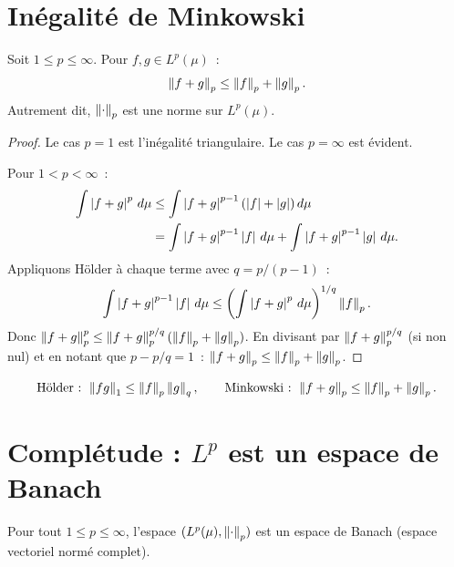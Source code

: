 \section{In\'egalit\'e de Minkowski}

\begin{theoreme}
\label{thm:minkowski}
Soit $1 \leq p \leq \infty$. Pour $f, g \in L^p(\mu)$~:
\[
\left\| f + g \right\|_p \leq \left\| f \right\|_p + \left\| g \right\|_p.
\]
Autrement dit, $\left\| \cdot \right\|_p$ est une norme sur $L^p(\mu)$.
\end{theoreme}

\begin{proof}
Le cas $p = 1$ est l'in\'egalit\'e triangulaire. Le cas $p = \infty$ est \'evident.

Pour $1 < p < \infty$~:
\begin{align*}
\int \left| f + g \right|^p\, d\mu &\leq \int \left| f + g \right|^{p-1} (\left| f \right| + \left| g \right|)\, d\mu
\\
&= \int \left| f + g \right|^{p-1} \left| f \right|\, d\mu + \int \left| f + g \right|^{p-1} \left| g \right|\, d\mu.
\end{align*}
Appliquons H\"older \`a chaque terme avec $q = p/(p-1)$~:
\[
\int \left| f + g \right|^{p-1} \left| f \right|\, d\mu \leq
\left(\int \left| f + g \right|^p\, d\mu\right)^{1/q} \left\| f \right\|_p.
\]
Donc $\left\| f + g \right\|_p^p \leq \left\| f + g \right\|_p^{p/q} (\left\| f \right\|_p + \left\| g \right\|_p)$.
En divisant par $\left\| f + g \right\|_p^{p/q}$ (si non nul) et en notant que
$p - p/q = 1$~: $\left\| f + g \right\|_p \leq \left\| f \right\|_p + \left\| g \right\|_p$.
\end{proof}

\begin{formules}[title=\textbf{In\'egalit\'es fondamentales}]
\[
\text{H\"older : } \left\| fg \right\|_1 \leq \left\| f \right\|_p \left\| g \right\|_q, \qquad
\text{Minkowski : } \left\| f + g \right\|_p \leq \left\| f \right\|_p + \left\| g \right\|_p.
\]
\end{formules}

\section{Compl\'etude : $L^p$ est un espace de Banach}

\begin{theoreme}
\label{thm:riesz_fischer}
Pour tout $1 \leq p \leq \infty$, l'espace $(L^p(\mu), \left\| \cdot \right\|_p)$ est un
espace de Banach (espace vectoriel norm\'e complet).
\end{theoreme}

